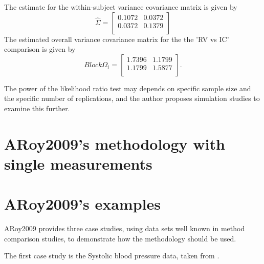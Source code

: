 \documentclass[12pt, a4paper]{report}
\theoremstyle{plain}
\theoremstyle{definition}
\theoremstyle{remark}
\begin{document}
	The estimate for the within-subject variance covariance matrix is
	given by
	\begin{equation}
	\hat{\Sigma}= \left[ \begin{array}{cc}
	0.1072 & 0.0372  \\
	0.0372 & 0.1379  \\
	\end{array}\right]
	\end{equation}
	The estimated overall variance covariance matrix for the the 'RV
	vs IC' comparison is given by
	\begin{equation}
	Block \Omega_{i}= \left[ \begin{array}{cc}
	1.7396 & 1.1799  \\
	1.1799 & 1.5877  \\
	\end{array} \right].
	\end{equation}
	
	The power of the
	likelihood ratio test may depends on specific sample size and the
	specific number of  replications, and the author proposes
	simulation studies to examine this further.
	
	
	
	\newpage
	
	
	
	
	
	
	\section{ARoy2009's methodology with single measurements}
	
	
	\section{ARoy2009's examples}
	ARoy2009 provides three case studies, using data sets well known in method comparison studies, to demonstrate how the methodology should be used.
	
	
	
	The first case study is the Systolic blood pressure data, taken from \citet{BA99}.
	
\end{document}
